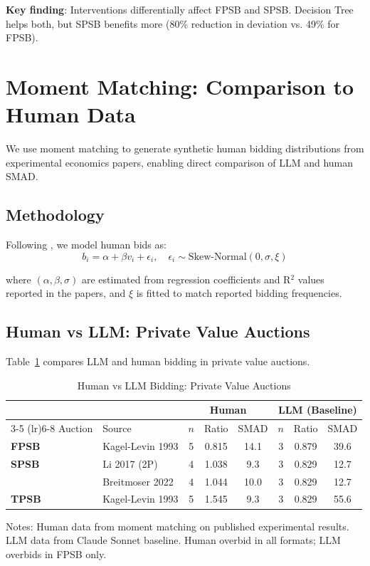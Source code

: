 \documentclass[12pt]{article}
\begin{document}
\textbf{Key finding}: Interventions differentially affect FPSB and SPSB. Decision Tree helps both, but SPSB benefits more (80\% reduction in deviation vs. 49\% for FPSB).

\section{Moment Matching: Comparison to Human Data}

We use moment matching to generate synthetic human bidding distributions from experimental economics papers, enabling direct comparison of LLM and human SMAD.

\subsection{Methodology}

Following \citet{kagel1993independent}, we model human bids as:
\begin{equation}
    b_i = \alpha + \beta v_i + \epsilon_i, \quad \epsilon_i \sim \text{Skew-Normal}(0, \sigma, \xi)
\end{equation}

where $(\alpha, \beta, \sigma)$ are estimated from regression coefficients and R$^2$ values reported in the papers, and $\xi$ is fitted to match reported bidding frequencies.

\subsection{Human vs LLM: Private Value Auctions}

Table~\ref{tab:human_vs_llm_ipv} compares LLM and human bidding in private value auctions.

\begin{table}[h]
\centering
\caption{Human vs LLM Bidding: Private Value Auctions}
\label{tab:human_vs_llm_ipv}
\begin{tabular}{llcccccc}
\toprule
& & \multicolumn{3}{c}{\textbf{Human}} & \multicolumn{3}{c}{\textbf{LLM (Baseline)}} \\
\cmidrule(lr){3-5} \cmidrule(lr){6-8}
Auction & Source & $n$ & Ratio & SMAD & $n$ & Ratio & SMAD \\
\midrule
\textbf{FPSB} & Kagel-Levin 1993 & 5 & 0.815 & 14.1 & 3 & 0.879 & 39.6 \\
\textbf{SPSB} & Li 2017 (2P) & 4 & 1.038 & 9.3 & 3 & 0.829 & 12.7 \\
& Breitmoser 2022 & 4 & 1.044 & 10.0 & 3 & 0.829 & 12.7 \\
\textbf{TPSB} & Kagel-Levin 1993 & 5 & 1.545 & 9.3 & 3 & 0.829 & 55.6 \\
\bottomrule
\end{tabular}
\smallskip
\begin{minipage}{0.95\textwidth}
\footnotesize
Notes: Human data from moment matching on published experimental results. LLM data from Claude Sonnet baseline. Human overbid in all formats; LLM overbids in FPSB only.
\end{minipage}
\end{table}
\end{document}
